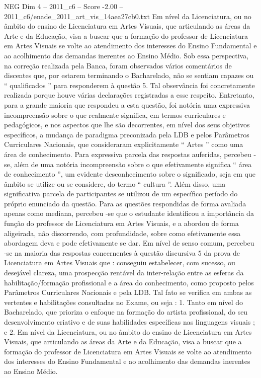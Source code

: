 \begin{textsample}{NEG Dim 4 – 2011\_c6 – Score -2.00 – 2011\_c6/enade\_2011\_art\_vis\_14aea27cb0.txt}
Em nível da Licenciatura, ou no âmbito do ensino de Licenciatura em Artes Visuais, que articulando as áreas da Arte e da Educação, visa a buscar que a formação do professor de Licenciatura em Artes Visuais se volte ao atendimento dos interesses do Ensino Fundamental e ao acolhimento das demandas inerentes ao Ensino Médio.
Sob essa perspectiva, na correção realizada pela Banca, foram observados vários comentários de discentes que, por estarem terminando o Bacharelado, não se sentiam capazes ou “ qualificados ” para responderem à questão 5.
Tal observância foi concretamente realizada porque houve várias declarações registradas a esse respeito.
Entretanto, para a grande maioria que respondeu a esta questão, foi notória uma expressiva incompreensão sobre o que realmente significa, em termos curriculares e pedagógicos, e nos aspectos que lhe são decorrentes, em nível dos seus objetivos específicos, a mudança de paradigma preconizada pela LDB e pelos Parâmetros Curriculares Nacionais, que consideraram explicitamente “ Artes ” como uma área de conhecimento.
Para expressiva parcela das respostas auferidas, percebeu -se, além de uma notória incompreensão sobre o que efetivamente significa “ área de conhecimento ”, um evidente desconhecimento sobre o significado, seja em que âmbito se utilize ou se considere, do termo “ cultura ”.
Além disso, uma significativa parcela de participantes se utilizou de um específico período do próprio enunciado da questão.
Para as questões respondidas de forma avaliada apenas como mediana, percebeu -se que o estudante identificou a importância da função do professor de Licenciatura em Artes Visuais, e a abordou de forma aligeirada, não discorrendo, com profundidade, sobre como efetivamente essa abordagem deva e pode efetivamente se dar.
Em nível de senso comum, percebeu -se na maioria das respostas concernentes à questão discursiva 5 da prova de Licenciatura em Artes Visuais que : conseguiu estabelecer, com sucesso, ou desejável clareza, uma prospecção rentável da inter-relação entre as esferas da habilitação/formação profissional e a área do conhecimento, como proposto pelos Parâmetros Curriculares Nacionais e pela LDB.
Tal fato se verifica em ambas as vertentes e habilitações consultadas no Exame, ou seja : 1.
Tanto em nível do Bacharelado, que prioriza o enfoque na formação do artista profissional, do seu desenvolvimento criativo e de suas habilidades específicas nas linguagens visuais ; e 2.
Em nível da Licenciatura, ou no âmbito do ensino de Licenciatura em Artes Visuais, que articulando as áreas da Arte e da Educação, visa a buscar que a formação do professor de Licenciatura em Artes Visuais se volte ao atendimento dos interesses do Ensino Fundamental e ao acolhimento das demandas inerentes ao Ensino Médio.

\end{textsample}
